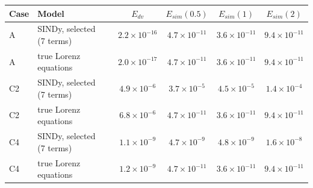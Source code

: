 \begin{tabular}{lllcccc}\toprule Case & Model & & $E_{dv}$ & $E_{sim}(0.5)$ & $E_{sim}(1)$ & $E_{sim}(2)$\\\midrule
A & SINDy, selected (7 terms) & & $2.2\!\times\!10^{-16}$ & $4.7\!\times\!10^{-11}$ & $3.6\!\times\!10^{-11}$ & $9.4\!\times\!10^{-11}$\\
A & true Lorenz equations & & $2.0\!\times\!10^{-17}$ & $4.7\!\times\!10^{-11}$ & $3.6\!\times\!10^{-11}$ & $9.4\!\times\!10^{-11}$\\
\addlinespace
C2 & SINDy, selected (7 terms) & & $4.9\!\times\!10^{-6}$ & $3.7\!\times\!10^{-5}$ & $4.5\!\times\!10^{-5}$ & $1.4\!\times\!10^{-4}$\\
C2 & true Lorenz equations & & $6.8\!\times\!10^{-6}$ & $4.7\!\times\!10^{-11}$ & $3.6\!\times\!10^{-11}$ & $9.4\!\times\!10^{-11}$\\
\addlinespace
C4 & SINDy, selected (7 terms) & & $1.1\!\times\!10^{-9}$ & $4.7\!\times\!10^{-9}$ & $4.8\!\times\!10^{-9}$ & $1.6\!\times\!10^{-8}$\\
C4 & true Lorenz equations & & $1.2\!\times\!10^{-9}$ & $4.7\!\times\!10^{-11}$ & $3.6\!\times\!10^{-11}$ & $9.4\!\times\!10^{-11}$\\
\bottomrule\end{tabular}